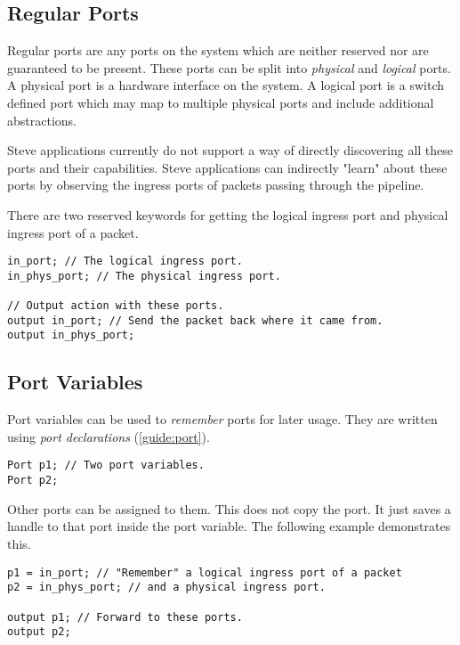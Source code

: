 \subsection{Regular Ports} \label{tut:regular_ports}

Regular ports are any ports on the system which are neither reserved nor are
guaranteed to be present. These ports can be split into \textit{physical} and
\textit{logical} ports. A physical port is a hardware interface on the system. A
logical port is a switch defined port which may map to multiple physical ports
and include additional abstractions.

Steve applications currently do not support a way of directly discovering all
these ports and their capabilities. Steve applications can indirectly "learn"
about these ports by observing the ingress ports of packets passing
through the pipeline.

There are two reserved keywords for getting the logical ingress port and physical ingress port of a packet.

\begin{codepage}
\begin{lstlisting}
in_port; // The logical ingress port.
in_phys_port; // The physical ingress port.

// Output action with these ports.
output in_port; // Send the packet back where it came from.
output in_phys_port;
\end{lstlisting}
\end{codepage}

\subsection{Port Variables} \label{tut:declared_ports}

Port variables can be used to \textit{remember} ports for later usage. They are
written using \textit{port declarations} (\ref{guide:port}).

\begin{codepage}
\begin{lstlisting}
Port p1; // Two port variables.
Port p2;
\end{lstlisting}
\end{codepage}

Other ports can be assigned to them. This does not copy the port. It just saves
a handle to that port inside the port variable. The following example demonstrates this.

\begin{codepage}
\begin{lstlisting}
p1 = in_port; // "Remember" a logical ingress port of a packet
p2 = in_phys_port; // and a physical ingress port.

output p1; // Forward to these ports.
output p2;
\end{lstlisting}
\end{codepage}

